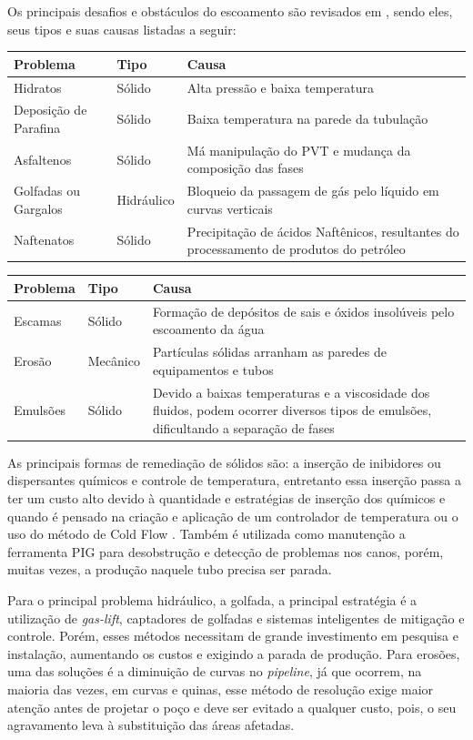 \documentclass{article}[12pt, openright, oneside, a4paper, portuguese]
\begin{document}
    Os principais desafios e obstáculos do escoamento são revisados em , sendo eles, seus tipos e suas causas listadas a seguir:
    
    \begin{center}
    \begin{tabular}{||p{4cm}|p{3cm}|p{8cm}||}
    \hline
    Problema & Tipo & Causa \\
    \hline
    Hidratos & Sólido & Alta pressão e baixa temperatura \\
    Deposição de Parafina & Sólido & Baixa temperatura na parede da tubulação \\
    Asfaltenos & Sólido & Má manipulação do PVT e mudança da composição das fases \\
    Golfadas ou Gargalos & Hidráulico & Bloqueio da passagem de gás pelo líquido em curvas verticais \\
    Naftenatos & Sólido & Precipitação de ácidos Naftênicos, resultantes do processamento de produtos do petróleo \\
    \hline
    \end{tabular}
    \begin{tabular}{||p{4cm}|p{3cm}|p{8cm}||}
    \hline
    Problema & Tipo & Causa \\
    \hline
    Escamas & Sólido & Formação de depósitos de sais e óxidos insolúveis pelo escoamento da água \\
    Erosão & Mecânico & Partículas sólidas arranham as paredes de equipamentos e tubos \\
    Emulsões & Sólido & Devido a baixas temperaturas e a viscosidade dos fluidos, podem ocorrer diversos tipos de emulsões, dificultando a separação de fases\\
    \hline
    \end{tabular}
    \end{center}

    As principais formas de remediação de sólidos são: a inserção de inibidores ou dispersantes químicos e controle de temperatura, entretanto essa inserção passa a ter um custo alto devido à quantidade e estratégias de inserção dos químicos e quando é pensado na criação e aplicação de um controlador de temperatura ou o uso do método de Cold Flow \cite{Garcia2008}. Também é utilizada como manutenção a ferramenta PIG para desobstrução e detecção de problemas nos canos, porém, muitas vezes, a produção naquele tubo precisa ser parada.

    Para o principal problema hidráulico, a golfada, a principal estratégia é a utilização de \textit{gas-lift}, captadores de golfadas e sistemas inteligentes de mitigação e controle. Porém, esses métodos necessitam de grande investimento em pesquisa e instalação, aumentando os custos e exigindo a parada de produção. Para erosões, uma das soluções é a diminuição de curvas no \textit{pipeline}, já que ocorrem, na maioria das vezes, em curvas e quinas, esse método de resolução exige maior atenção antes de projetar o poço e deve ser evitado a qualquer custo, pois, o seu agravamento leva à substituição das áreas afetadas.
\end{document}
